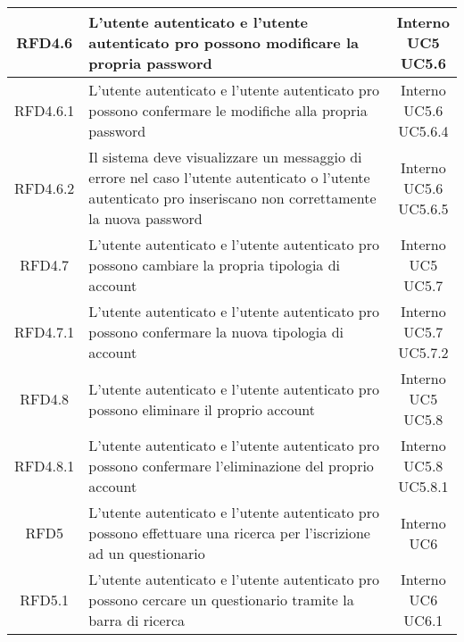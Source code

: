 \begin{longtable}{|c|>{\centering}m{7cm}|c|}
			 \hypertarget{{RFD4.6}}{{RFD4.6}} & L’utente autenticato e l’utente autenticato pro possono modificare la propria password & \makecell{Interno\\ UC5 \\UC5.6 } \\ \hline
			 \hypertarget{{RFD4.6.1}}{{RFD4.6.1}} & L’utente autenticato e l’utente autenticato pro possono confermare le modifiche alla propria password  & \makecell{Interno\\ UC5.6 \\UC5.6.4 } \\ \hline
			 \hypertarget{{RFD4.6.2}}{{RFD4.6.2}} & Il sistema deve visualizzare un messaggio di errore nel caso l’utente autenticato o l’utente autenticato pro inseriscano non correttamente la nuova password & \makecell{Interno\\ UC5.6 \\UC5.6.5 } \\ \hline
			 \hypertarget{{RFD4.7}}{{RFD4.7}} & L’utente autenticato e l’utente autenticato pro possono cambiare la propria tipologia di account & \makecell{Interno\\ UC5 \\UC5.7 } \\ \hline
			 \hypertarget{{RFD4.7.1}}{{RFD4.7.1}} & L’utente autenticato e l’utente autenticato pro possono confermare la nuova tipologia di account  & \makecell{Interno\\ UC5.7 \\UC5.7.2 } \\ \hline
			 \hypertarget{{RFD4.8}}{{RFD4.8}} & L’utente autenticato e l’utente autenticato pro possono eliminare il proprio account  & \makecell{Interno\\ UC5 \\UC5.8 } \\ \hline
			 \hypertarget{{RFD4.8.1}}{{RFD4.8.1}} & L’utente autenticato e l’utente autenticato pro possono confermare l’eliminazione del proprio account & \makecell{Interno\\ UC5.8 \\UC5.8.1 } \\ \hline
			 \hypertarget{{RFD5}}{{RFD5}} & L’utente autenticato e l’utente autenticato pro possono effettuare una ricerca per l’iscrizione ad un questionario & \makecell{Interno\\ UC6 } \\ \hline
			 \hypertarget{{RFD5.1}}{{RFD5.1}} & L’utente autenticato e l’utente autenticato pro possono cercare un questionario tramite la barra di ricerca & \makecell{Interno\\ UC6 \\UC6.1 } \\ \hline

\end{longtable}
